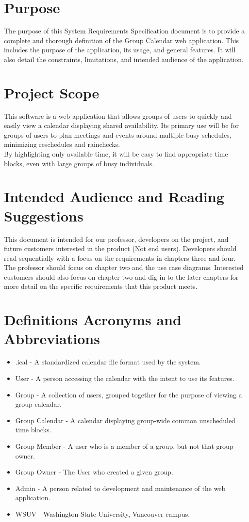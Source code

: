 \documentclass{scrreprt}
\begin{document}
\section{Purpose}

The purpose of this System Requirements Specification document is to
provide a complete and thorough definition of the Group Calendar web application.
This includes the purpose of the application, its usage, and general features. It will
also detail the constraints, limitations, and intended audience of the application.


\section{Project Scope}

This software is a web application that allows groups of users to quickly and easily 
view a calendar displaying shared availability. Its primary use will be for groups of 
users to plan meetings and events around multiple busy schedules, minimizing 
reschedules and rainchecks.
\\By highlighting only available time, it will be easy to find
appropriate time blocks, even with large groups of busy individuals.


\section{Intended Audience and Reading Suggestions}

This document is intended for our professor, developers on the project, and
future customers interested in the product (Not end users). Developers should
read sequentially with a focus on the requirements in chapters three and four.
The professor should focus on chapter two and the use case diagrams. Interested
customers should also focus on chapter two and dig in to the later chapters for
more detail on the specific requirements that this product meets.


\section{Definitions Acronyms and Abbreviations}
\begin{itemize}
\item .ical - A standardized calendar file format used by the system.
\item User - A person accessing the calendar with the intent to use its 
features.
\item Group - A collection of users, grouped together for the purpose of viewing
a group calendar.
\item Group Calendar - A calendar displaying group-wide common unscheduled time blocks.
\item Group Member - A user who is a member of a group, but not that group owner.
\item Group Owner - The User who created a given group.
\item Admin - A person related to development and maintenance of the web application.
\item WSUV - Washington State University, Vancouver campus.
\end{itemize}
\end{document}
